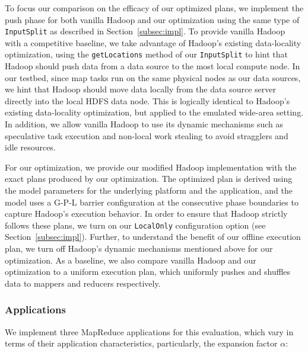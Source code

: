 To focus our comparison on the efficacy of our optimized plans, we implement
the push phase for both vanilla Hadoop and our optimization using the same type
of \verb=InputSplit= as described in Section~\ref{subsec:impl}.
To provide vanilla Hadoop with a competitive baseline, we take advantage of
Hadoop's existing data-locality optimization, using the \verb=getLocations=
method of our \verb=InputSplit= to hint that Hadoop should push data from a
data source to the most local compute node.
In our testbed, since map tasks run on the same physical nodes as our data
sources, we hint that Hadoop should move data locally from the data source
server directly into the local HDFS data node.
This is logically identical to Hadoop's existing data-locality optimization,
but applied to the emulated wide-area setting.
In addition, we allow vanilla Hadoop to use its dynamic mechanisms such as
speculative task execution and non-local work stealing to avoid stragglers and
idle resources.

For our optimization, we provide our modified Hadoop implementation with the
exact plans produced by our optimization.
The optimized plan is derived using the model parameters for the underlying
platform and the application, and the model uses a G-P-L barrier configuration
at the consecutive phase boundaries to capture Hadoop's execution behavior.
In order to ensure that Hadoop strictly follows these plans, we turn on our
\verb=LocalOnly= configuration option (see Section~\ref{subsec:impl}).
Further, to understand the benefit of our offline execution plan, we turn off
Hadoop's dynamic mechanisms mentioned above for our optimization.
As a baseline, we also compare vanilla Hadoop and our optimization to a uniform
execution plan, which uniformly pushes and shuffles data to mappers and
reducers respectively.

\subsubsection{Applications}

We implement three MapReduce applications for this evaluation, which vary in
terms of their application characteristics, particularly, the expansion factor
$\alpha$:

